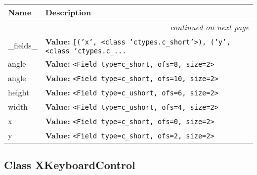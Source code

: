     \vspace{-1cm}
\hspace{\varindent}\begin{longtable}{|p{\varnamewidth}|p{\vardescrwidth}|l}
\cline{1-2}
\cline{1-2} \centering \textbf{Name} & \centering \textbf{Description}& \\
\cline{1-2}
\endhead\cline{1-2}\multicolumn{3}{r}{\small\textit{continued on next page}}\\\endfoot\cline{1-2}
\endlastfoot\raggedright \_\-f\-i\-e\-l\-d\-s\-\_\- & \raggedright \textbf{Value:} 
{\tt \texttt{[}\texttt{(}\texttt{'}\texttt{x}\texttt{'}\texttt{, }{\textless}class 'ctypes.c\_short'{\textgreater}\texttt{)}\texttt{, }\texttt{(}\texttt{'}\texttt{y}\texttt{'}\texttt{, }{\textless}class 'ctypes.c\_\texttt{...}}&\\
\cline{1-2}
\raggedright a\-n\-g\-l\-e\-1\- & \raggedright \textbf{Value:} 
{\tt {\textless}Field type=c\_short, ofs=8, size=2{\textgreater}}&\\
\cline{1-2}
\raggedright a\-n\-g\-l\-e\-2\- & \raggedright \textbf{Value:} 
{\tt {\textless}Field type=c\_short, ofs=10, size=2{\textgreater}}&\\
\cline{1-2}
\raggedright h\-e\-i\-g\-h\-t\- & \raggedright \textbf{Value:} 
{\tt {\textless}Field type=c\_ushort, ofs=6, size=2{\textgreater}}&\\
\cline{1-2}
\raggedright w\-i\-d\-t\-h\- & \raggedright \textbf{Value:} 
{\tt {\textless}Field type=c\_ushort, ofs=4, size=2{\textgreater}}&\\
\cline{1-2}
\raggedright x\- & \raggedright \textbf{Value:} 
{\tt {\textless}Field type=c\_short, ofs=0, size=2{\textgreater}}&\\
\cline{1-2}
\raggedright y\- & \raggedright \textbf{Value:} 
{\tt {\textless}Field type=c\_short, ofs=2, size=2{\textgreater}}&\\
\cline{1-2}
\end{longtable}



\subsection{Class XKeyboardControl}

